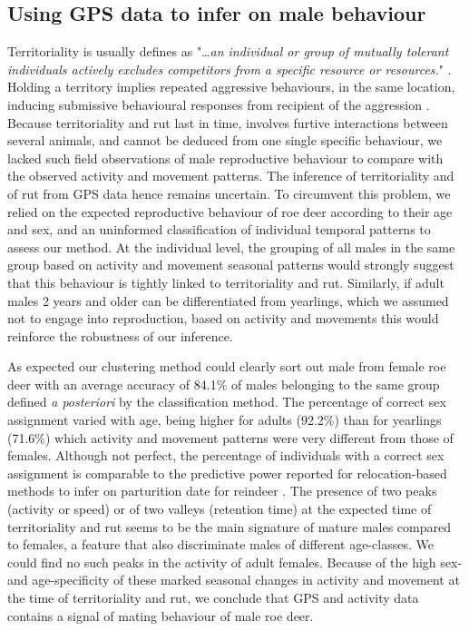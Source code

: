 \documentclass[a4paper,11pt]{article}
\begin{document}
  \subsection*{Using GPS data to infer on male behaviour}

  Territoriality is usually defines as "\ldots \textit{an individual or group of mutually tolerant individuals actively excludes competitors from a specific resource or resources.}" \citep{maher_review_2000}. Holding a territory implies repeated aggressive behaviours, in the same location, inducing submissive behavioural responses from recipient of the aggression \citep{pyke_territoriality_1996}. Because territoriality and rut last in time, involves furtive interactions between several animals, and cannot be deduced from one single specific behaviour, we lacked such field observations of male reproductive behaviour to compare with the observed activity and movement patterns. The inference of territoriality and of rut from GPS data hence remains uncertain. To circumvent this problem, we relied on the expected reproductive behaviour of roe deer according to their age and sex, and an uninformed classification of individual temporal patterns to assess our method. At the individual level, the grouping of all males in the same group based on activity and movement seasonal patterns would strongly suggest that this behaviour is tightly linked  to territoriality and rut. Similarly, if adult males 2 years and older can be differentiated from yearlings, which we assumed not to engage into reproduction, based on activity and movements this would reinforce the robustness of our inference. 


  As expected our clustering method could clearly sort out male from female roe deer with an average accuracy of 84.1\% of males belonging to the same group defined \textit{a posteriori} by the classification method. The percentage of correct sex assignment varied with age, being higher for adults (92.2\%) than for yearlings (71.6\%) which activity and movement patterns were very different from those of females. Although not perfect, the percentage of individuals with a correct sex assignment is comparable to the predictive power reported for relocation-based methods to infer on parturition date for reindeer \citep[80\% on average,][]{bonar_implementing_2018, cameron_movement-based_2018}. The presence of two peaks (activity or speed) or of two valleys (retention time) at the expected time of territoriality and rut seems to be the main signature of mature males compared to females, a feature that also discriminate males of different age-classes. We could find no such peaks in the activity of adult females. Because of the high sex- and age-specificity of these marked seasonal changes in activity and movement at the time of territoriality and rut, we conclude that GPS and activity data contains a signal of mating behaviour of male roe deer.
\end{document}
